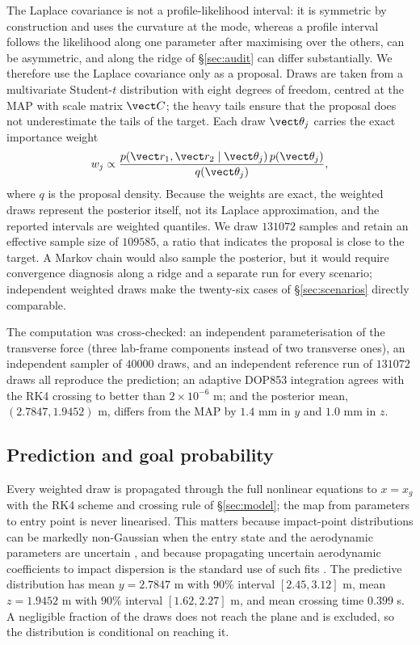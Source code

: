 The Laplace covariance is not a profile-likelihood interval: it is symmetric by
construction and uses the curvature at the mode, whereas a profile interval
follows the likelihood along one parameter after maximising over the others, can
be asymmetric, and along the ridge of \S\ref{sec:audit} can differ
substantially. We therefore use the Laplace covariance only as a proposal. Draws are taken from a multivariate Student-$t$ distribution with
eight degrees of freedom, centred at the MAP with scale matrix $\vect C$; the
heavy tails ensure that the proposal does not underestimate the tails of the
target. Each draw $\vect\theta_j$ carries the exact importance weight
\begin{equation}
  w_j\propto\frac{p(\vect r_1,\vect r_2\mid\vect\theta_j)\,p(\vect\theta_j)}
  {q(\vect\theta_j)},
  \label{eq:weights}
\end{equation}
where $q$ is the proposal density. Because the weights are exact, the weighted
draws represent the posterior itself, not its Laplace approximation, and the
reported intervals are weighted quantiles. We draw $131072$ samples and retain
an effective sample size of $109585$, a ratio that indicates the proposal is
close to the target. A Markov chain would also sample the posterior, but it
would require convergence diagnosis along a ridge and a separate run for every
scenario; independent weighted draws make the twenty-six cases of
\S\ref{sec:scenarios} directly comparable.

The computation was cross-checked: an independent parameterisation of the
transverse force (three lab-frame components instead of two transverse ones), an
independent sampler of $40000$ draws, and an independent reference run of
$131072$ draws all reproduce the prediction; an adaptive DOP853 integration
agrees with the RK4 crossing to better than $2\times10^{-6}$ m; and the
posterior mean, $(2.7847,1.9452)$ m, differs from the MAP by $1.4$ mm in $y$
and $1.0$ mm in $z$.

\subsection{Prediction and goal probability}
\label{sec:prediction}
\label{sec:answer}

Every weighted draw is propagated through the full nonlinear equations to
$x=x_g$ with the RK4 scheme and crossing rule of \S\ref{sec:model}; the map from
parameters to entry point is never linearised. This matters because impact-point
distributions can be markedly non-Gaussian when the entry state and the
aerodynamic parameters are uncertain \citep{williamson2017}, and because
propagating uncertain aerodynamic coefficients to impact dispersion is the
standard use of such fits \citep{mehta2015}. The predictive distribution has
mean $y=2.7847$ m with $90\%$ interval $[2.45,3.12]$ m, mean $z=1.9452$ m with
$90\%$ interval $[1.62,2.27]$ m, and mean crossing time $0.399$ s. A negligible
fraction of the draws does not reach the plane and is excluded, so the
distribution is conditional on reaching it.

